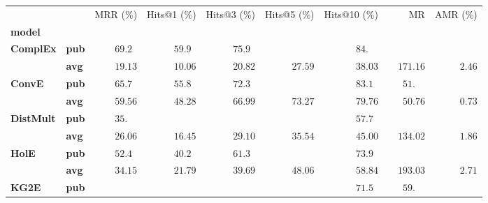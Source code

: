 \begin{tabular}{llrrrrrrr}
\toprule
       &     &           MRR (\%) &        Hits@1 (\%) &        Hits@3 (\%) &        Hits@5 (\%) &       Hits@10 (\%) &                              MR &            AMR (\%) \\
\textbf{model} & {} &                    &                    &                    &                    &                    &                                 &                     \\
\midrule
\textbf{ComplEx} & \textbf{pub} &  $69.2\phantom{0}$ &  $59.9\phantom{0}$ &  $75.9\phantom{0}$ &                    &  $84.\phantom{00}$ &                                 &                     \\
       & \textbf{avg} &            $19.13$ &            $10.06$ &            $20.82$ &            $27.59$ &            $38.03$ &            $\phantom{00}171.16$ &  $\phantom{00}2.46$ \\
\textbf{ConvE} & \textbf{pub} &  $65.7\phantom{0}$ &  $55.8\phantom{0}$ &  $72.3\phantom{0}$ &                    &  $83.1\phantom{0}$ &  $\phantom{000}51.\phantom{00}$ &                     \\
       & \textbf{avg} &            $59.56$ &            $48.28$ &            $66.99$ &            $73.27$ &            $79.76$ &            $\phantom{000}50.76$ &  $\phantom{00}0.73$ \\
\textbf{DistMult} & \textbf{pub} &  $35.\phantom{00}$ &                    &                    &                    &  $57.7\phantom{0}$ &                                 &                     \\
       & \textbf{avg} &            $26.06$ &            $16.45$ &            $29.10$ &            $35.54$ &            $45.00$ &            $\phantom{00}134.02$ &  $\phantom{00}1.86$ \\
\textbf{HolE} & \textbf{pub} &  $52.4\phantom{0}$ &  $40.2\phantom{0}$ &  $61.3\phantom{0}$ &                    &  $73.9\phantom{0}$ &                                 &                     \\
       & \textbf{avg} &            $34.15$ &            $21.79$ &            $39.69$ &            $48.06$ &            $58.84$ &            $\phantom{00}193.03$ &  $\phantom{00}2.71$ \\
\textbf{KG2E} & \textbf{pub} &                    &                    &                    &                    &  $71.5\phantom{0}$ &  $\phantom{000}59.\phantom{00}$ &                     \\

\end{tabular}
